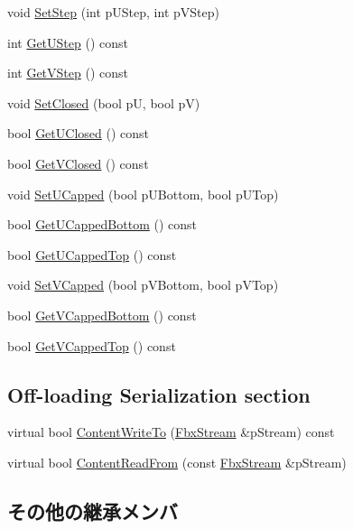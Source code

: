 \begin{DoxyCompactItemize}
void \hyperlink{class_fbx_patch_a9b1fca6dfff6bf62472528b5a12ea987}{Set\+Step} (int p\+U\+Step, int p\+V\+Step)
\item 
int \hyperlink{class_fbx_patch_a875381a084e1b98773fff2bfddcae827}{Get\+U\+Step} () const
\item 
int \hyperlink{class_fbx_patch_a71e7d7a25b3cfc9fad3ffd8835b6337e}{Get\+V\+Step} () const
\item 
void \hyperlink{class_fbx_patch_af3d5e55f5523f2872b7fbb8082200f9b}{Set\+Closed} (bool pU, bool pV)
\item 
bool \hyperlink{class_fbx_patch_aa4f5d7f204475afe6cd5160e7081eeef}{Get\+U\+Closed} () const
\item 
bool \hyperlink{class_fbx_patch_aea85ef627c9d56153e85ad0007101f72}{Get\+V\+Closed} () const
\item 
void \hyperlink{class_fbx_patch_a9bd77e38cd9e41cf52638272fb240fdf}{Set\+U\+Capped} (bool p\+U\+Bottom, bool p\+U\+Top)
\item 
bool \hyperlink{class_fbx_patch_af134ac0b9f507a259fb20426647b49ed}{Get\+U\+Capped\+Bottom} () const
\item 
bool \hyperlink{class_fbx_patch_a97f060bdd4c569854101b1a2a0750534}{Get\+U\+Capped\+Top} () const
\item 
void \hyperlink{class_fbx_patch_a11fa20b64650ce4312b5238e8fde6cb8}{Set\+V\+Capped} (bool p\+V\+Bottom, bool p\+V\+Top)
\item 
bool \hyperlink{class_fbx_patch_a57ded499bc9f25f46dd2b3acd44a23f7}{Get\+V\+Capped\+Bottom} () const
\item 
bool \hyperlink{class_fbx_patch_a55ab377367fd1592ef5111a85e0f7a48}{Get\+V\+Capped\+Top} () const
\end{DoxyCompactItemize}
\subsection*{Off-\/loading Serialization section}
\begin{DoxyCompactItemize}
\item 
virtual bool \hyperlink{class_fbx_patch_a2ecc16ad355ca521c921ec3731719585}{Content\+Write\+To} (\hyperlink{class_fbx_stream}{Fbx\+Stream} \&p\+Stream) const
\item 
virtual bool \hyperlink{class_fbx_patch_ad1aac4a2e0e820f27ff9a0123ba5756e}{Content\+Read\+From} (const \hyperlink{class_fbx_stream}{Fbx\+Stream} \&p\+Stream)
\end{DoxyCompactItemize}
\subsection*{その他の継承メンバ}


